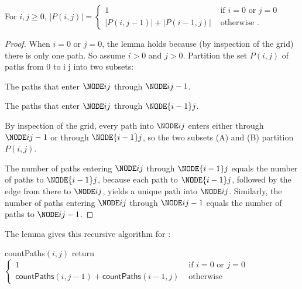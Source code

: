 \begin{lemma}\label{dp: lemma z} For $i, j \ge 0$,
  \(
    |P(i,j)| = \begin{cases}
      1 & \text{ if } i=0 \text{ or } j=0 \\
      |P(i,j-1)| + |P(i-1,j)| & \text{ otherwise }.
    \end{cases}
  \)
\end{lemma}
\begin{proof}
  When $i=0$ or $j=0$, the lemma holds because (by inspection of the grid) there is only one path.
  So assume $i>0$ and $j>0$.
  Partition the set $P(i,j)$ of paths from  0 to \NODE i j
  into two subsets:
  \begin{mylist}
  \item[(A)] The paths that enter $\NODE i j$  through $\NODE i {j-1}$.
  \item[(B)] The paths that enter  $\NODE i j$ through $\NODE {i-1} j$.
  \end{mylist}
  By inspection of the grid, every path into $\NODE i  j$
  enters either through  $\NODE i {j-1}$ or through  $\NODE {i-1} j$, 
  so the two subsets (A) and (B) partition $P(i,j)$.

  The number of paths entering $\NODE i j$ through $\NODE {i-1} j$
  equals the number of paths to $\NODE {i-1} j$,
  because each path to $\NODE {i-1} j$,
  followed by the edge from there to $\NODE i j$,
  yields a unique path into $\NODE i j$.
  Similarly, the number of paths entering $\NODE i j$ through $\NODE i {j-1}$
  equals the number of paths to $\NODE i {j-1}$.
\end{proof}

\newcommand{\countPaths}{\textsf{countPaths}}

The lemma gives this recursive algorithm for :
\begin{myframed}
  \begin{steps}
  \item[]
    \countPaths$(i, j)$ 
    \step return \(
      \begin{cases}
        1 & \text{ if } i = 0 \text{ or } j = 0
        \\
        \countPaths(i, j-1) + \countPaths(i-1, j)
        & \text{ otherwise }
      \end{cases}
    \)
  \end{steps}
\end{myframed}

